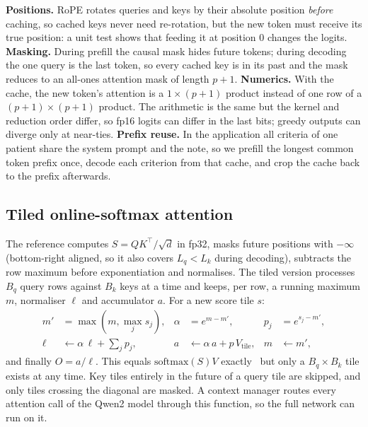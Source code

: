 \documentclass[conference]{IEEEtran}
\begin{document}
\textbf{Positions.} RoPE rotates queries and keys by their absolute position \emph{before} caching, so cached keys never need re-rotation, but the new token must receive its true position: a unit test shows that feeding it at position 0 changes the logits. \textbf{Masking.} During prefill the causal mask hides future tokens; during decoding the one query is the last token, so every cached key is in its past and the mask reduces to an all-ones attention mask of length $p+1$. \textbf{Numerics.} With the cache, the new token's attention is a $1\times(p+1)$ product instead of one row of a $(p+1)\times(p+1)$ product. The arithmetic is the same but the kernel and reduction order differ, so fp16 logits can differ in the last bits; greedy outputs can diverge only at near-ties. \textbf{Prefix reuse.} In the application all criteria of one patient share the system prompt and the note, so we prefill the longest common token prefix once, decode each criterion from that cache, and crop the cache back to the prefix afterwards.

\subsection{Tiled online-softmax attention}
The reference computes $S=QK^\top/\sqrt{d}$ in fp32, masks future positions with $-\infty$ (bottom-right aligned, so it also covers $L_q<L_k$ during decoding), subtracts the row maximum before exponentiation and normalises. The tiled version processes $B_q$ query rows against $B_k$ keys at a time and keeps, per row, a running maximum $m$, normaliser $\ell$ and accumulator $a$. For a new score tile $s$:
\begin{equation}
\begin{aligned}
m' &= \max(m, \max_j s_j), & \alpha &= e^{m-m'}, & p_j &= e^{s_j-m'},\\
\ell &\leftarrow \alpha\,\ell + \textstyle\sum_j p_j, & a &\leftarrow \alpha\,a + p\,V_{\text{tile}}, & m &\leftarrow m',
\end{aligned}
\end{equation}
and finally $O=a/\ell$. This equals $\mathrm{softmax}(S)V$ exactly~\cite{milakov2018online,dao2022flashattention} but only a $B_q\times B_k$ tile exists at any time. Key tiles entirely in the future of a query tile are skipped, and only tiles crossing the diagonal are masked. A context manager routes every attention call of the Qwen2 model through this function, so the full network can run on it.
\end{document}
